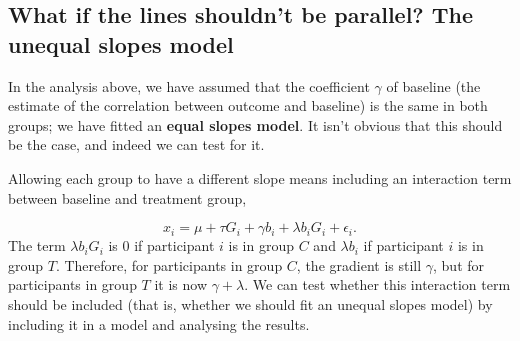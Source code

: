 \documentclass[
  openany]{book}
\theoremstyle{definition}
\theoremstyle{definition}
\theoremstyle{definition}
\theoremstyle{definition}
\theoremstyle{remark}
\begin{document}
\hypertarget{what-if-the-lines-shouldnt-be-parallel-the-unequal-slopes-model}{%
\subsection{What if the lines shouldn't be parallel? The unequal slopes model}\label{what-if-the-lines-shouldnt-be-parallel-the-unequal-slopes-model}}

In the analysis above, we have assumed that the coefficient \(\gamma\) of baseline (the estimate of the correlation between outcome and baseline) is the same in both groups; we have fitted an \textbf{equal slopes model}. It isn't obvious that this should be the case, and indeed we can test for it.

Allowing each group to have a different slope means including an interaction term between baseline and treatment group,

\[ x_i = \mu + \tau G_i+ \gamma b_i + \lambda b_i G_i + \epsilon_i . \]
The term \(\lambda b_i G_i\) is 0 if participant \(i\) is in group \(C\) and \(\lambda b_i\) if participant \(i\) is in group \(T\). Therefore, for participants in group \(C\), the gradient is still \(\gamma\), but for participants in group \(T\) it is now \(\gamma + \lambda\). We can test whether this interaction term should be included (that is, whether we should fit an unequal slopes model) by including it in a model and analysing the results.
\end{document}

